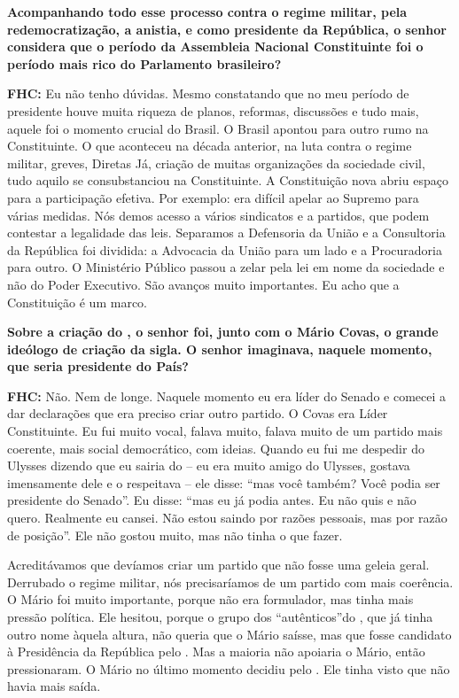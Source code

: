 \textbf{Acompanhando todo esse processo contra o regime militar, pela
redemocratização, a anistia, e como presidente da República, o senhor
considera que o período da Assembleia Nacional Constituinte foi o
período mais rico do Parlamento brasileiro?}

\textbf{FHC:} Eu não tenho dúvidas. Mesmo constatando que no meu período
de presidente houve muita riqueza de planos, reformas, discussões e tudo
mais, aquele foi o momento crucial do Brasil. O Brasil apontou para
outro rumo na Constituinte. O que aconteceu na década anterior, na luta
contra o regime militar, greves, Diretas Já, criação de muitas
organizações da sociedade civil, tudo aquilo se consubstanciou na
Constituinte. A Constituição nova abriu espaço para a participação
efetiva. Por exemplo: era difícil apelar ao Supremo para várias medidas.
Nós demos acesso a vários sindicatos e a partidos, que podem contestar a
legalidade das leis. Separamos a Defensoria da União e a Consultoria da
República foi dividida: a Advocacia da União para um lado e a
Procuradoria para outro. O Ministério Público passou a zelar pela lei em
nome da sociedade e não do Poder Executivo. São avanços muito
importantes. Eu acho que a Constituição é um marco.

\textbf{Sobre a criação do , o senhor foi, junto com o Mário Covas,
o grande ideólogo de criação da sigla. O senhor imaginava, naquele
momento, que seria presidente do País?}

\textbf{FHC:} Não. Nem de longe. Naquele momento eu era líder do Senado
e comecei a dar declarações que era preciso criar outro partido. O Covas
era Líder Constituinte. Eu fui muito vocal, falava muito, falava muito
de um partido mais coerente, mais social democrático, com ideias. Quando
eu fui me despedir do Ulysses dizendo que eu sairia do  -- eu era
muito amigo do Ulysses, gostava imensamente dele e o respeitava -- ele
disse: ``mas você também? Você podia ser presidente do Senado''. Eu
disse: ``mas eu já podia antes. Eu não quis e não quero. Realmente eu
cansei. Não estou saindo por razões pessoais, mas por razão de
posição''. Ele não gostou muito, mas não tinha o que fazer.

Acreditávamos que devíamos criar um partido que não fosse uma geleia
geral. Derrubado o regime militar, nós precisaríamos de um partido com
mais coerência. O Mário foi muito importante, porque não era formulador,
mas tinha mais pressão política. Ele hesitou, porque o grupo dos
``autênticos''do , que já tinha outro nome àquela altura, não queria
que o Mário saísse, mas que fosse candidato à Presidência da República
pelo . Mas a maioria não apoiaria o Mário, então pressionaram. O
Mário no último momento decidiu pelo . Ele tinha visto que não havia
mais saída.

